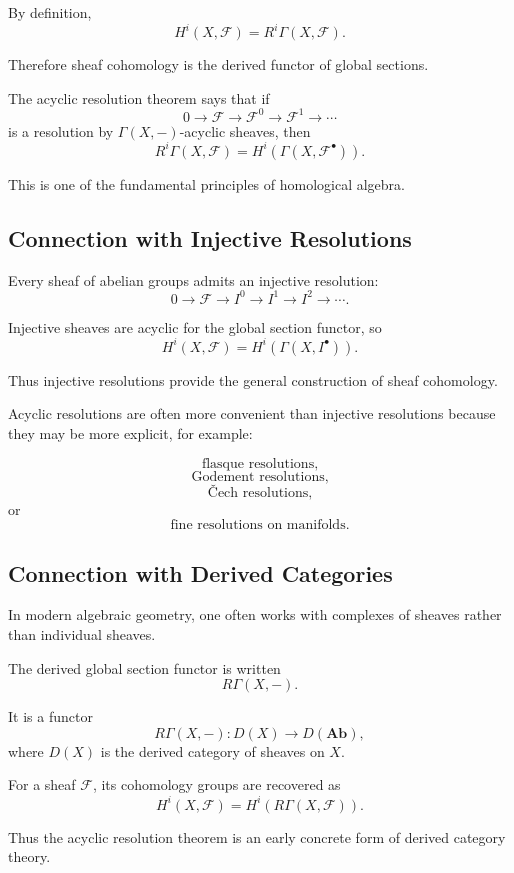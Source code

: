 \documentclass[12pt,a4paper]{article}
\theoremstyle{notespace}
\begin{document}
By definition,
\[
H^i(X,\mathcal F)
=
R^i\Gamma(X,\mathcal F).
\]

Therefore sheaf cohomology is the derived functor of global sections.

The acyclic resolution theorem says that if
\[
0\to \mathcal F
\to \mathcal F^0
\to \mathcal F^1
\to \cdots
\]
is a resolution by \(\Gamma(X,-)\)-acyclic sheaves, then
\[
R^i\Gamma(X,\mathcal F)
=
H^i(\Gamma(X,\mathcal F^\bullet)).
\]

This is one of the fundamental principles of homological algebra.

\subsection{Connection with Injective Resolutions}

Every sheaf of abelian groups admits an injective resolution:
\[
0\to \mathcal F
\to I^0
\to I^1
\to I^2
\to \cdots .
\]

Injective sheaves are acyclic for the global section functor, so
\[
H^i(X,\mathcal F)
=
H^i(\Gamma(X,I^\bullet)).
\]

Thus injective resolutions provide the general construction of sheaf cohomology.

Acyclic resolutions are often more convenient than injective resolutions because they may be more explicit, for example:

\[
\text{flasque resolutions,}
\]
\[
\text{Godement resolutions,}
\]
\[
\text{\v{C}ech resolutions,}
\]
or
\[
\text{fine resolutions on manifolds.}
\]

\subsection{Connection with Derived Categories}

In modern algebraic geometry, one often works with complexes of sheaves rather than individual sheaves.

The derived global section functor is written
\[
R\Gamma(X,-).
\]

It is a functor
\[
R\Gamma(X,-):D(X)\to D(\mathbf{Ab}),
\]
where \(D(X)\) is the derived category of sheaves on \(X\).

For a sheaf \(\mathcal F\), its cohomology groups are recovered as
\[
H^i(X,\mathcal F)
=
H^i(R\Gamma(X,\mathcal F)).
\]

Thus the acyclic resolution theorem is an early concrete form of derived category theory.
\end{document}
